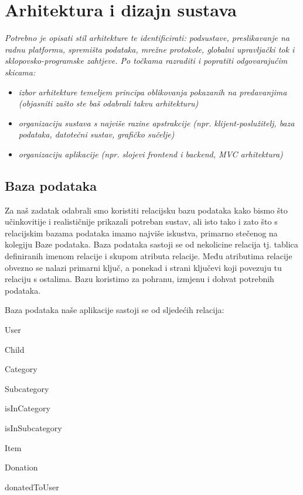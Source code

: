 \chapter{Arhitektura i dizajn sustava}
		

		\textit{ Potrebno je opisati stil arhitekture te identificirati: podsustave, preslikavanje na radnu platformu, spremišta podataka, mrežne protokole, globalni upravljački tok i sklopovsko-programske zahtjeve. Po točkama razraditi i popratiti odgovarajućim skicama:}
	\begin{itemize}
		\item 	\textit{izbor arhitekture temeljem principa oblikovanja pokazanih na predavanjima (objasniti zašto ste baš odabrali takvu arhitekturu)}
		\item 	\textit{organizaciju sustava s najviše razine apstrakcije (npr. klijent-poslužitelj, baza podataka, datotečni sustav, grafičko sučelje)}
		\item 	\textit{organizaciju aplikacije (npr. slojevi frontend i backend, MVC arhitektura) }		
	\end{itemize}
				
		\eject 

		\section{Baza podataka}
			
		Za naš zadatak odabrali smo koristiti relacijsku bazu podataka kako bismo što učinkovitije i realističnije prikazali potreban sustav, 
		ali isto tako i zato što s relacijskim bazama podataka imamo najviše iskustva, primarno stečenog na kolegiju Baze podataka.
		Baza podataka sastoji se od nekolicine relacija tj. tablica definiranih imenom relacije i skupom atributa relacije.
		Među atributima relacije obvezno se nalazi primarni ključ, a ponekad i strani ključevi koji povezuju tu relaciju s ostalima.
		Bazu koristimo za pohranu, izmjenu i dohvat potrebnih podataka.

		\vspace{15pt}

		Baza podataka naše aplikacije sastoji se od sljedećih relacija:
		\begin{packed_item}
			\item User
			\item Child
			\item Category
			\item Subcategory
			\item isInCategory
			\item isInSubcategory
			\item Item
			\item Donation
			\item donatedToUser
		\end{packed_item}
			
